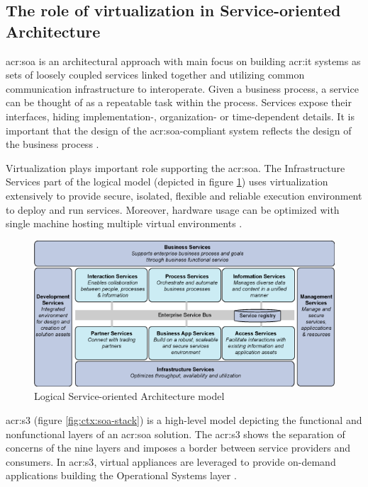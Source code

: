 \documentclass[11pt,openany]{book}
\begin{document}
      \subsection{The role of virtualization in Service-oriented Architecture}

        \gls{acr:soa} is an architectural approach with main focus on building \gls{acr:it} systems as sets of loosely
        coupled services linked together and utilizing common communication infrastructure to interoperate. Given a
        business process, a service can be thought of as a repeatable task within the process. Services expose their
        interfaces, hiding implementation-, organization- or time-dependent details. It is important that the design of
        the \gls{acr:soa}-compliant system reflects the design of the business process \cite{soa-foundation}.

        Virtualization plays important role supporting the \gls{acr:soa}. The Infrastructure Services part of the
        logical model (depicted in figure \ref{fig:ctx:soa-logical}) uses virtualization extensively to provide secure,
        isolated, flexible and reliable execution environment to deploy and run services. Moreover, hardware usage can
        be optimized with single machine hosting multiple virtual environments \cite{soa-foundation}.

        \begin{figure}[h]
          \begin{center}
            \includegraphics[scale=.5]{img/ctx/soa-logical.png}
          \end{center}

          \caption{Logical Service-oriented Architecture model \cite{soa-foundation}}
          \label{fig:ctx:soa-logical}
        \end{figure}

        \gls{acr:s3} (figure \ref{fig:ctx:soa-stack}) is a high-level model depicting the functional and nonfunctional
        layers of an \gls{acr:soa} solution.  The \gls{acr:s3} shows the separation of concerns of the nine layers and
        imposes a border between service providers and consumers. In \gls{acr:s3}, virtual appliances are leveraged to
        provide on-demand applications building the Operational Systems layer \cite{soa-stack}.
\end{document}
